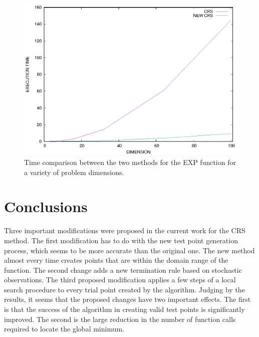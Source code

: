 \documentclass[symmetry,article,submit,moreauthors,pdftex]{Definitions/mdpi}
\begin{document}
\begin{figure}
\caption{Time comparison between the two methods for the EXP function for a variety of problem dimensions.\\ \label{fig:TimeComparison}}

\begin{centering}
\includegraphics[scale=0.7]{expplot}
\par\end{centering}
\end{figure}




\section{Conclusions \label{sec:Conclusions}}

Three important modifications were proposed in the current work for
the CRS method. The first modification has to do with the new test
point generation process, which seems to be more accurate than the
original one. The new method almost every time creates points that
are within the domain range of the function. The second change adds
a new termination rule based on stochastic observations. The third
proposed modification applies a few steps of a local search procedure
to every trial point created by the algorithm. Judging by the results,
it seems that the proposed changes have two important effects. The
first is that the success of the algorithm in creating valid test
points is significantly improved. The second is the large reduction
in the number of function calls required to locate the global minimum. 
\end{document}
